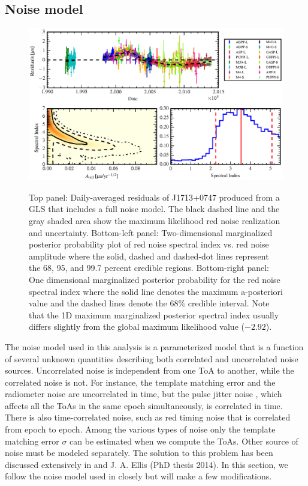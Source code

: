 
\subsection{Noise model}
\label{sec:noise}

%
\begin{figure}[!ht]
\includegraphics[scale=1.0]{fig3.eps} \\ 
\caption{\label{fig:res} Top panel: Daily-averaged residuals of J1713+0747 produced from a GLS that includes a 
full noise model. The black dashed line and the gray shaded area show the maximum likelihood red noise
realization and uncertainty. Bottom-left panel: Two-dimensional marginalized posterior probability plot of red
noise spectral index vs. red noise amplitude where the solid, dashed and
dashed-dot lines represent the 68, 95, and 99.7 percent credible regions.
Bottom-right panel: One dimensional marginalized posterior probability for the
red noise spectral index where the solid line denotes the maximum a-posteriori
value and the dashed lines denote the 68\% credible interval. Note that the
1D maximum marginalized posterior spectral index usually differs slightly from the
global maximum likelihood value ($-2.92$).}
\end{figure} 
%
The noise model used in this analysis is a parameterized model that is a function of several unknown quantities describing both correlated and uncorrelated noise sources. Uncorrelated noise is 
independent from one ToA to another, while the correlated noise is not. 
For instance, the template matching error and the radiometer noise are
uncorrelated in time, but the pulse jitter noise \citep{sc10}, which affects all the ToAs 
in the same epoch simultaneously, is correlated in time.
There is also time-correlated noise, such as red timing noise that is
correlated from epoch to epoch. Among the various types of noise only the
template matching error $\sigma$ can be estimated when we compute the ToAs.
Other source of noise must be modeled separately. The solution to this problem has been discussed extensively in \citet{vl13, ell13, vv14a, vv14, abb+14} and J. A. Ellis (PhD thesis 2014). In this section, we follow the noise model used in \citet{abb+14} closely but will make a few modifications.

